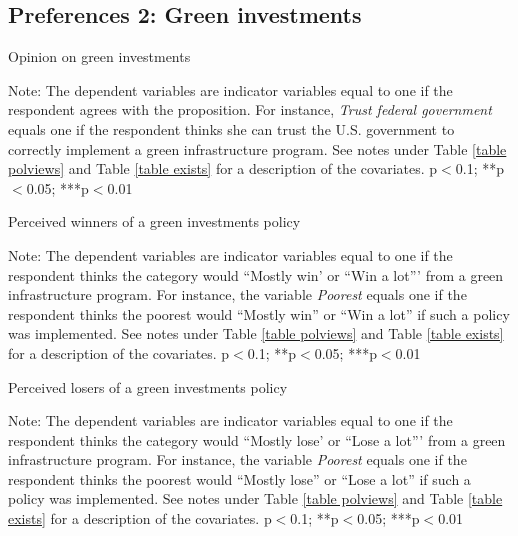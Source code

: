 \documentclass{article}
\begin{document}
\clearpage
\subsection{Preferences 2: Green investments}



\begin{table}[h!]
	\caption{Opinion on green investments}
	\begin{center}
		\scalebox{0.7}{}
	\end{center}
	{\footnotesize Note: The dependent variables are indicator variables equal to one if the respondent agrees with the proposition. For instance, \textit{Trust federal government} equals one if the respondent thinks she can trust the U.S. government to correctly implement a green infrastructure program. See notes under Table \ref{table polviews} and Table \ref{table exists} for a description of the covariates.
	\newline *p$<$0.1; **p$<$0.05; ***p$<$0.01}
\end{table}	

\begin{table}[h!]
	\caption{Perceived winners of a green investments policy}
	\begin{center}
		\scalebox{0.7}{}
	\end{center}
	{\footnotesize Note: The dependent variables are indicator variables equal to one if the respondent thinks the category would ``Mostly win' or ``Win a lot''' from a green infrastructure program. For instance, the variable \textit{Poorest} equals one if the respondent thinks the poorest would ``Mostly win'' or ``Win a lot'' if such a policy was implemented. See notes under Table \ref{table polviews} and Table \ref{table exists} for a description of the covariates.
	\newline *p$<$0.1; **p$<$0.05; ***p$<$0.01}
\end{table}	

\begin{table}[h!]
	\caption{Perceived losers of a green investments policy}
	\begin{center}
		\scalebox{0.7}{}
	\end{center}
	{\footnotesize Note: The dependent variables are indicator variables equal to one if the respondent thinks the category would ``Mostly lose' or ``Lose a lot''' from a green infrastructure program. For instance, the variable \textit{Poorest} equals one if the respondent thinks the poorest would ``Mostly lose'' or ``Lose a lot'' if such a policy was implemented. See notes under Table \ref{table polviews} and Table \ref{table exists} for a description of the covariates.
	\newline *p$<$0.1; **p$<$0.05; ***p$<$0.01}
\end{table}	
\end{document}

